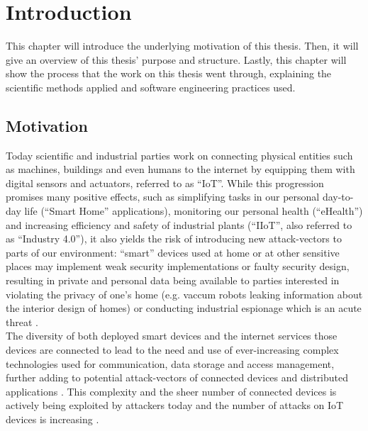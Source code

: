 \chapter{Introduction}
\label{chap:introduction}
This chapter will introduce the underlying motivation of this thesis. Then, it will give an overview of this thesis' purpose and structure. Lastly, this chapter will show the process that the work on this thesis went through, explaining the scientific methods applied and software engineering practices used.

\section{Motivation}
Today scientific and industrial parties work on connecting physical entities such as machines, buildings and even humans to the internet by equipping them with digital sensors and actuators, referred to as \enquote{\ac{IoT}}. While this progression promises many positive effects, such as simplifying tasks in our personal day-to-day life (\enquote{Smart Home} applications), monitoring our personal health (\enquote{eHealth}) %
and increasing efficiency and safety of industrial plants (\enquote{\ac{IIoT}}, also referred to as \enquote{Industry 4.0}), it also yields the risk of introducing new attack-vectors to parts of our environment: \enquote{smart} devices used at home or at other sensitive places may implement weak security implementations or faulty security design, resulting in private and personal data being available to parties interested in violating the privacy of one's home (e.g. vaccum robots leaking information about the interior design of homes\cite{wittenhorst_2019}) or conducting industrial espionage which is an acute threat \cite[p.~14]{bartsch_gentemann_kob_krösmann_mille_petri_ritter_rost_schmidt_schulz_2018}.\\
The diversity of both deployed smart devices and the internet services those devices are connected to lead to the need and use of ever-increasing complex technologies used for communication, data storage and access management, further adding to potential attack-vectors of connected devices and distributed applications \cite[p.~119]{Jäger_Schöllhammer_Lickefett_Bauernhansl_2016}.
This complexity and the sheer number of connected devices is actively being exploited by attackers today and the number of attacks on \ac{IoT} devices is increasing \cite{demeter_preuss_shmelev_2019}.\\
